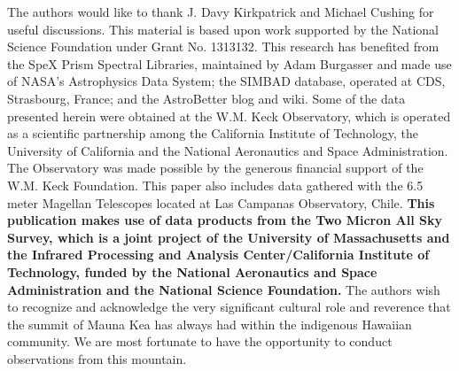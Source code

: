 \documentclass[12pt]{aastex6}
\begin{document}
The authors would like to thank J. Davy Kirkpatrick and Michael Cushing for useful discussions.
This material is based upon work supported by the National Science Foundation under Grant No. 1313132.
This research has benefited from the SpeX Prism Spectral Libraries, maintained by Adam Burgasser
and made use of NASA's Astrophysics Data System; the SIMBAD database, operated at CDS, Strasbourg, France; and the AstroBetter blog and wiki.
Some of the data presented herein were obtained at the W.M. Keck Observatory, which is operated as a scientific partnership among the California Institute of Technology, the University of California and the National Aeronautics and Space Administration. The Observatory was made possible by the generous financial support of the W.M. Keck Foundation.
This paper also includes data gathered with the 6.5 meter Magellan Telescopes located at Las Campanas Observatory, Chile.
\textbf{This publication makes use of data products from the Two Micron All Sky Survey, which is a joint project of the University of Massachusetts and the Infrared Processing and Analysis Center/California Institute of Technology, funded by the National Aeronautics and Space Administration and the National Science Foundation.}
The authors wish to recognize and acknowledge the very significant cultural role and reverence that the summit of Mauna Kea has always had within the indigenous Hawaiian community.  We are most fortunate to have the opportunity to conduct observations from this mountain.




\end{document}
